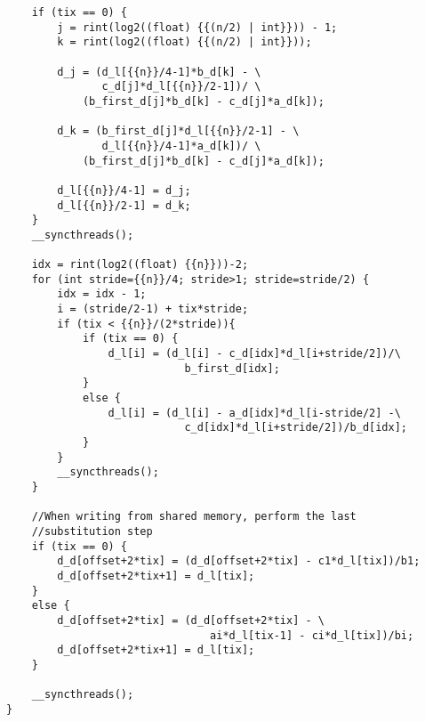 \begin{verbatim}
    if (tix == 0) {
        j = rint(log2((float) {{(n/2) | int}})) - 1;
        k = rint(log2((float) {{(n/2) | int}}));

        d_j = (d_l[{{n}}/4-1]*b_d[k] - \
               c_d[j]*d_l[{{n}}/2-1])/ \
            (b_first_d[j]*b_d[k] - c_d[j]*a_d[k]);

        d_k = (b_first_d[j]*d_l[{{n}}/2-1] - \
               d_l[{{n}}/4-1]*a_d[k])/ \
            (b_first_d[j]*b_d[k] - c_d[j]*a_d[k]);

        d_l[{{n}}/4-1] = d_j;
        d_l[{{n}}/2-1] = d_k;
    }
    __syncthreads();
    
    idx = rint(log2((float) {{n}}))-2;
    for (int stride={{n}}/4; stride>1; stride=stride/2) {
        idx = idx - 1;
        i = (stride/2-1) + tix*stride;
        if (tix < {{n}}/(2*stride)){
            if (tix == 0) {
                d_l[i] = (d_l[i] - c_d[idx]*d_l[i+stride/2])/\
                            b_first_d[idx];
            }
            else {
                d_l[i] = (d_l[i] - a_d[idx]*d_l[i-stride/2] -\
                            c_d[idx]*d_l[i+stride/2])/b_d[idx];
            }
        }
        __syncthreads();
    }

    //When writing from shared memory, perform the last
    //substitution step
    if (tix == 0) {
        d_d[offset+2*tix] = (d_d[offset+2*tix] - c1*d_l[tix])/b1;
        d_d[offset+2*tix+1] = d_l[tix];
    }
    else {
        d_d[offset+2*tix] = (d_d[offset+2*tix] - \
                                ai*d_l[tix-1] - ci*d_l[tix])/bi;
        d_d[offset+2*tix+1] = d_l[tix];
    } 
    
    __syncthreads();
}
\end{verbatim}
